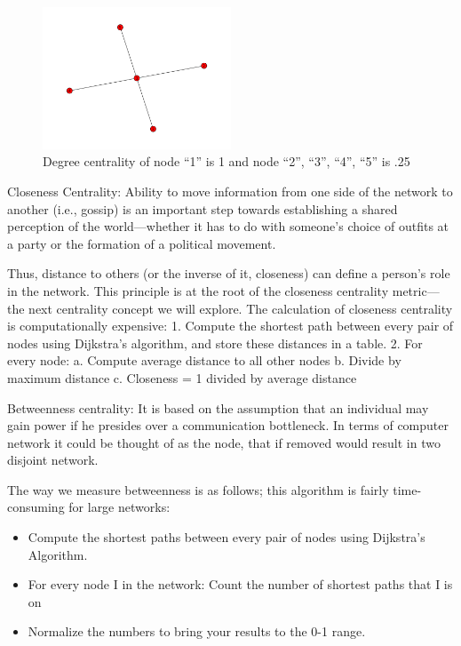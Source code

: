 \documentclass[AER]{AEA}
\begin{document}
\begin{figure}[h]
\caption{Degree centrality of node “1” is 1 and node “2”, “3”, “4”, “5” is .25}
\centering
\includegraphics[width=0.5\textwidth]{degree_example}
\end{figure}

Closeness Centrality:
	Ability to move information from one side of the network to another (i.e., gossip) is an important step towards establishing a shared perception of the world—whether it has to do with someone’s choice of outfits at a party or the formation of a political movement. 

Thus, distance to others (or the inverse of it, closeness) can define a person’s role in 
the network. This principle is at the root of the closeness centrality metric—the next 
centrality concept we will explore. 
The calculation of closeness centrality is computationally expensive: 
1. Compute the shortest path between every pair of nodes using Dijkstra’s algorithm, 
and store these distances in a table. 
2. For every node: 
	a. Compute average distance to all other nodes 
	b. Divide by maximum distance 
	c. Closeness = 1 divided by average distance 

Betweenness centrality: It is based on the assumption that an individual may gain power 
if he presides over a communication bottleneck. In terms of computer network it could be thought of as the node, that if removed would result in two disjoint network.

The way we measure betweenness is as follows; this algorithm is fairly time-consuming 
for large networks: 
\begin{itemize}

\item Compute the shortest paths between every pair of nodes using Dijkstra's 
Algorithm. 
\item For every node I in the network: 
	 Count the number of shortest paths that I is on 
\item Normalize the numbers to bring your results to the 0-1 range. 
\end{itemize}
\end{document}
